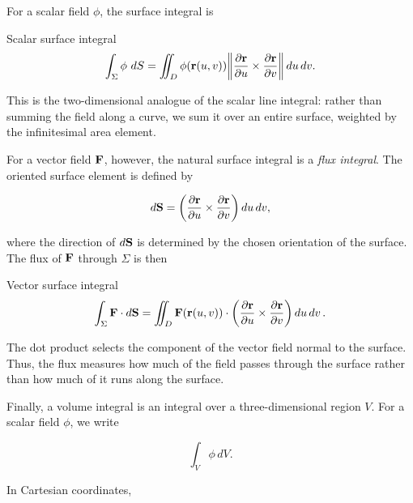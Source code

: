 			For a scalar field $\phi$, the surface integral is

			\begin{definition}{Scalar surface integral}
				\begin{equation}
					\int_\Sigma \phi\,\dd{S}
					=
					\iint_D
					\phi(\vb r(u,v))
					\norm{
						\pdv{\vb r}{u}
						\times
						\pdv{\vb r}{v}
					}
					\,du\,dv.
				\end{equation}
			\end{definition}

			This is the two-dimensional analogue of the scalar line integral: rather than summing the field along a curve, we sum it over an entire surface, weighted by the infinitesimal area element.

			For a vector field $\vb F$, however, the natural surface integral is a \textit{flux integral}. The oriented surface element is defined by

			\begin{equation}
				d\vb S
				=
				\left(
					\pdv{\vb r}{u}
					\times
					\pdv{\vb r}{v}
				\right)
				du\,dv,
			\end{equation}

			where the direction of $d\vb S$ is determined by the chosen orientation of the surface. The flux of $\vb F$ through $\Sigma$ is then

			\begin{definition}{Vector surface integral}
				\begin{equation}
					\int_\Sigma \vb F\cdot d\vb S
					=
					\iint_D
					\vb F(\vb r(u,v))
					\cdot
					\qty(
						\pdv{\vb r}{u}
						\times
						\pdv{\vb r}{v}
					)
					\dd{u}\dd{v}.
				\end{equation}
			\end{definition}

			The dot product selects the component of the vector field normal to the surface. Thus, the flux measures how much of the field passes through the surface rather than how much of it runs along the surface.


			Finally, a volume integral is an integral over a three-dimensional region $V$. For a scalar field $\phi$, we write

			\begin{equation}
				\int_V \phi\,dV.
			\end{equation}

			In Cartesian coordinates,

